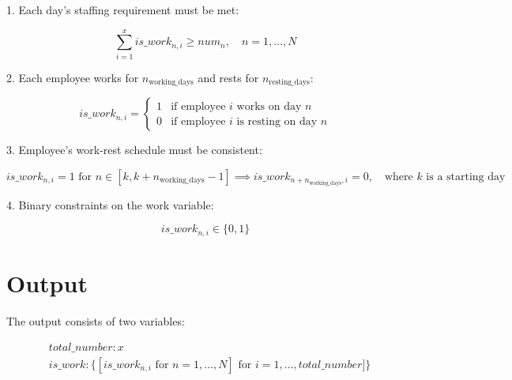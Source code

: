 \documentclass{article}
\begin{document}
1. Each day's staffing requirement must be met:

\[
\sum_{i=1}^{x} is\_work_{n, i} \geq num_n, \quad n = 1, \ldots, N
\]

2. Each employee works for \(n_{\text{working\_days}}\) and rests for \(n_{\text{resting\_days}}\):

\[
is\_work_{n, i} = 
\begin{cases}
1 & \text{if employee } i \text{ works on day } n \\
0 & \text{if employee } i \text{ is resting on day } n
\end{cases}
\]

3. Employee's work-rest schedule must be consistent:

\[
is\_work_{n, i} = 1 \text{ for } n \in [k, k + n_{\text{working\_days}} - 1] \implies is\_work_{n + n_{\text{working\_days}}, i} = 0, \quad \text{where } k \text{ is a starting day}
\]

4. Binary constraints on the work variable:

\[
is\_work_{n, i} \in \{0, 1\}
\]

\section*{Output}

The output consists of two variables:

\begin{align*}
& total\_number: x \\
& is\_work: \{[is\_work_{n, i} \text{ for } n = 1, \ldots, N] \text{ for } i = 1, \ldots, total\_number]\}
\end{align*}
\end{document}
